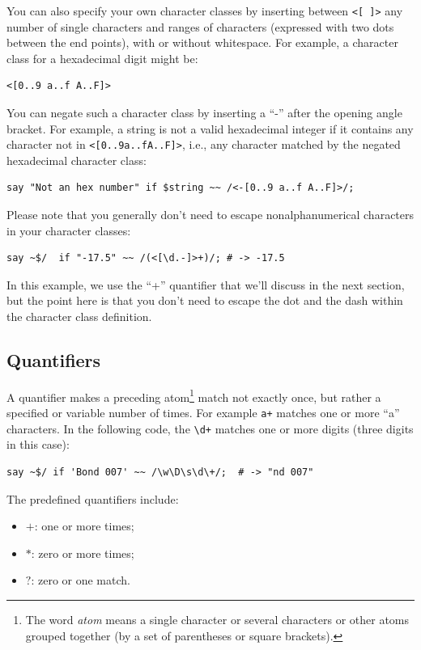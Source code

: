 You can also specify your own character classes by inserting 
between \verb'<[ ]>' any number of single characters and 
ranges of characters (expressed with two dots between the 
end points), with or without whitespace. For example, a 
character class for a hexadecimal digit might be:
\begin{verbatim}
<[0..9 a..f A..F]>
\end{verbatim}

You can negate such a character class by inserting a ``-'' after 
the opening angle bracket. For example, a string is not a 
valid hexadecimal integer if it contains any character not 
in \verb'<[0..9a..fA..F]>', i.e., any character matched by the 
negated hexadecimal character class:

\begin{verbatim}
say "Not an hex number" if $string ~~ /<-[0..9 a..f A..F]>/;
\end{verbatim}

Please note that you generally don't need to escape 
nonalphanumerical characters in your character classes:

\begin{verbatim}
say ~$/  if "-17.5" ~~ /(<[\d.-]>+)/; # -> -17.5
\end{verbatim}

In this example, we use the ``+'' quantifier that we'll discuss 
in the next section, but the point here is that you don't need 
to escape the dot and the dash within the character class 
definition.

\subsection{Quantifiers}

A quantifier makes a preceding atom\footnote{The 
word \emph{atom} means a single character or several 
characters or other atoms grouped together (by a set of 
parentheses or square brackets).} match not exactly once, 
but rather a specified or variable number of times.  For 
example \verb'a+' matches one or more ``a'' characters. In 
the following code, the \verb'\d+' matches one or more 
digits (three digits in this case):

\begin{verbatim}
say ~$/ if 'Bond 007' ~~ /\w\D\s\d\+/;  # -> "nd 007"
\end{verbatim}
%

The predefined quantifiers include:
\begin{itemize}
\item $+$: one or more times;
\item $*$: zero or more times;
\item $?$: zero or one match.
\end{itemize}

